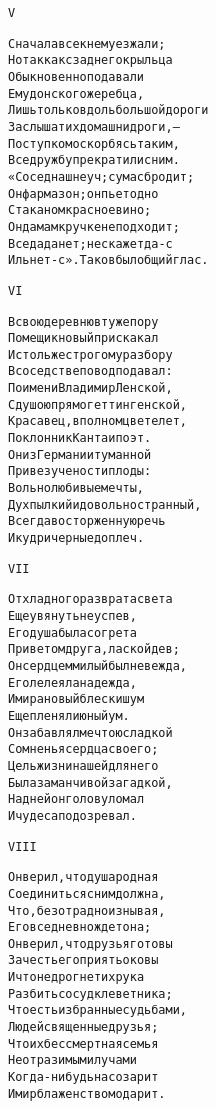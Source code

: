 \begin{minipage}[t]{\dimexpr 0.5\textwidth -\tabcolsep-.5pt}
\begin{alltt}\normalfont\centering
V

Сначала все к нему езжали;
Но так как с заднего крыльца
Обыкновенно подавали
Ему донского жеребца,
Лишь только вдоль большой дороги
Заслышат их домашни дроги, —
Поступком оскорбясь таким,
Все дружбу прекратили с ним.
«Сосед наш неуч; сумасбродит;
Он фармазон; он пьет одно
Стаканом красное вино;
Он дамам к ручке не подходит;
Все да да нет; не скажет да-с
Иль нет-с». Таков был общий глас.
\end{alltt}
\end{minipage}

\begin{minipage}[t]{\dimexpr 0.5\textwidth -\tabcolsep-.5pt}
\begin{alltt}\normalfont\centering
VI

В свою деревню в ту же пору
Помещик новый прискакал
И столь же строгому разбору
В соседстве повод подавал:
По имени Владимир Ленской,
С душою прямо геттингенской,
Красавец, в полном цвете лет,
Поклонник Канта и поэт.
Он из Германии туманной
Привез учености плоды:
Вольнолюбивые мечты,
Дух пылкий и довольно странный,
Всегда восторженную речь
И кудри черные до плеч.
\end{alltt}
\end{minipage}
\clearpage

\begin{minipage}[t]{\dimexpr 0.5\textwidth -\tabcolsep-.5pt}
\begin{alltt}\normalfont\centering
VII

От хладного разврата света
Еще увянуть не успев,
Его душа была согрета
Приветом друга, лаской дев;
Он сердцем милый был невежда,
Его лелеяла надежда,
И мира новый блеск и шум
Еще пленяли юный ум.
Он забавлял мечтою сладкой
Сомненья сердца своего;
Цель жизни нашей для него
Была заманчивой загадкой,
Над ней он голову ломал
И чудеса подозревал.
\end{alltt}
\end{minipage}

\begin{minipage}[t]{\dimexpr 0.5\textwidth -\tabcolsep-.5pt}
\begin{alltt}\normalfont\centering
VIII

Он верил, что душа родная
Соединиться с ним должна,
Что, безотрадно изнывая,
Его вседневно ждет она;
Он верил, что друзья готовы
За честь его приять оковы
И что не дрогнет их рука
Разбить сосуд клеветника;
Что есть избранные судьбами,
Людей священные друзья;
Что их бессмертная семья
Неотразимыми лучами
Когда-нибудь нас озарит
И мир блаженством одарит.
\end{alltt}
\end{minipage}
\clearpage

